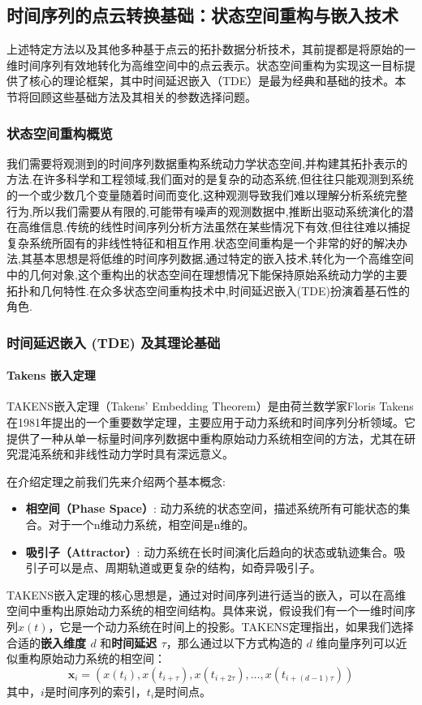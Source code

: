 \subsection{时间序列的点云转换基础：状态空间重构与嵌入技术} %
上述特定方法以及其他多种基于点云的拓扑数据分析技术，其前提都是将原始的一维时间序列有效地转化为高维空间中的点云表示。状态空间重构为实现这一目标提供了核心的理论框架，其中时间延迟嵌入（TDE）是最为经典和基础的技术。本节将回顾这些基础方法及其相关的参数选择问题。

\subsubsection{状态空间重构概览} %
我们需要将观测到的时间序列数据重构系统动力学状态空间,并构建其拓扑表示的方法.在许多科学和工程领域,我们面对的是复杂的动态系统,但往往只能观测到系统的一个或少数几个变量随着时间而变化,这种观测导致我们难以理解分析系统完整行为,所以我们需要从有限的,可能带有噪声的观测数据中,推断出驱动系统演化的潜在高维信息.传统的线性时间序列分析方法虽然在某些情况下有效,但往往难以捕捉复杂系统所固有的非线性特征和相互作用.状态空间重构是一个非常的好的解决办法,其基本思想是将低维的时间序列数据,通过特定的嵌入技术,转化为一个高维空间中的几何对象,这个重构出的状态空间在理想情况下能保持原始系统动力学的主要拓扑和几何特性.在众多状态空间重构技术中,时间延迟嵌入(TDE)扮演着基石性的角色.

\subsubsection{时间延迟嵌入 (TDE) 及其理论基础}
\paragraph{Takens 嵌入定理} %
TAKENS嵌入定理（Takens' Embedding Theorem）\cite{takens2006detecting}是由荷兰数学家Floris Takens在1981年提出的一个重要数学定理，主要应用于动力系统和时间序列分析领域。它提供了一种从单一标量时间序列数据中重构原始动力系统相空间的方法，尤其在研究混沌系统和非线性动力学时具有深远意义。

在介绍定理之前我们先来介绍两个基本概念:
\begin{itemize}
    \item \textbf{相空间（Phase Space）}: 动力系统的状态空间，描述系统所有可能状态的集合。对于一个n维动力系统，相空间是n维的。
    \item \textbf{吸引子（Attractor）}: 动力系统在长时间演化后趋向的状态或轨迹集合。吸引子可以是点、周期轨道或更复杂的结构，如奇异吸引子。
\end{itemize}
TAKENS嵌入定理的核心思想是，通过对时间序列进行适当的嵌入，可以在高维空间中重构出原始动力系统的相空间结构。具体来说，假设我们有一个一维时间序列$x(t)$，它是一个动力系统在时间上的投影。TAKENS定理指出，如果我们选择合适的\textbf{嵌入维度 $d$} 和\textbf{时间延迟 $\tau$}，那么通过以下方式构造的 $d$ 维向量序列可以近似重构原始动力系统的相空间：
\begin{equation}
    \mathbf{x}_i = (x(t_i), x(t_{i+\tau}), x(t_{i+2\tau}), \ldots, x(t_{i+(d-1)\tau}))
\end{equation}
其中，$i$是时间序列的索引，$t_i$是时间点。

